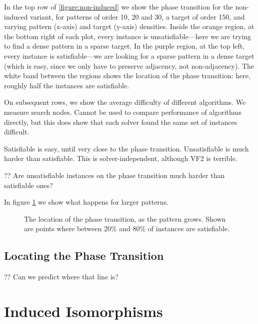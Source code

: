 \documentclass[letterpaper]{article}
\begin{document}
In the top row of \cref{figure:non-induced} we show the phase transition for the non-induced
variant, for patterns of order 10, 20 and 30, a target of order 150, and varying pattern (x-axis)
and target (y-axis) densities. Inside the orange region, at the bottom right of each plot, every
instance is unsatisfiable---here we are trying to find a dense pattern in a sparse target. In the
purple region, at the top left, every instance is satisfiable---we are looking for a sparse pattern
in a dense target (which is easy, since we only have to preserve adjacency, not non-adjacency). The
white band between the regions shows the location of the phase transition: here, roughly half the
instances are satisfiable.

On subsequent rows, we show the average difficulty of different algorithms.  We measure search
nodes. Cannot be used to compare performance of algorithms directly, but this does show that each
solver found the same set of instances difficult.

Satisfiable is easy, until very close to the phase transition. Unsatisfiable is much harder than
satisfiable. This is solver-independent, although VF2 is terrible.

?? Are unsatisfiable instances on the phase transition much harder than satisfiable ones?

In figure \cref{figure:phase-transition-bands} we show what happens for larger patterns.

\begin{figure}[tb]
    
    \caption{The location of the phase transition, as the pattern grows. Shown are points where
    between 20\% and 80\% of instances are satisfiable.}
    \label{figure:phase-transition-bands}
\end{figure}

\lipsum[4]

\subsection{Locating the Phase Transition}

?? Can we predict where that line is?

\lipsum[5]

\lipsum[6]

\section{Induced Isomorphisms}
\end{document}

